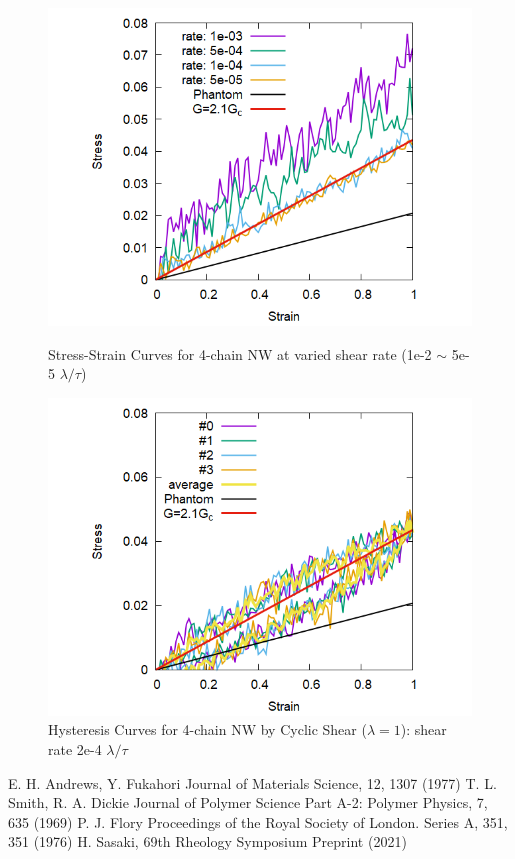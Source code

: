 \documentclass[uplatex,dvipdfmx,a4paper,11pt]{jsarticle}
\begin{document}
\begin{figure}[hb]
    \begin{minipage}{0.5\hsize}
        \begin{center}
        \includegraphics[width=.7\textwidth]{Shear_Random_4chain_N20.png}
        \caption{Stress-Strain Curves for 4-chain NW at varied shear rate (1e-2 $\sim$ 5e-5 $\lambda/\tau$)}
        \label{fig:deform}
        \end{center}
    \end{minipage}
    \begin{minipage}{0.5\hsize}
        \begin{center}
        \includegraphics[width=.7\textwidth]{CyclicDeform_4chain_rate_2e-4.png}
        \caption{Hysteresis Curves for 4-chain NW by Cyclic Shear ($\lambda = 1$): shear rate 2e-4 $\lambda/\tau$}
        \label{fig:hyst}
        \end{center}
    \end{minipage}
\end{figure}


\begin{thebibliography}{99}
     E. H. Andrews, Y. Fukahori Journal of Materials Science, 12, 1307 (1977)
     T. L. Smith, R. A. Dickie Journal of Polymer Science Part A-2: Polymer Physics, 7, 635 (1969)
     P. J. Flory Proceedings of the Royal Society of London. Series A, 351, 351 (1976)
     H. Sasaki, 69th Rheology Symposium Preprint (2021)
\end{thebibliography}
\end{document}
